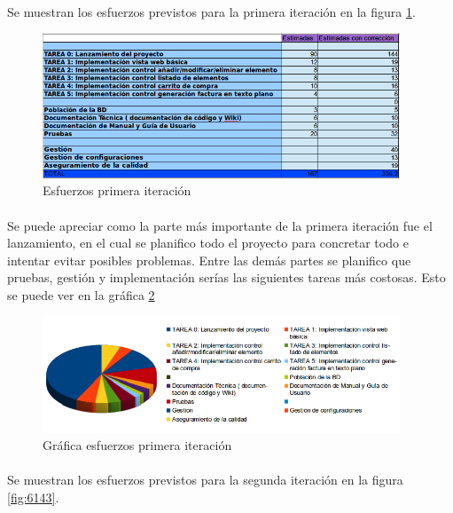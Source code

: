 

\paragraph{} Se muestran los esfuerzos previstos para la primera iteración en la figura \ref{fig:6141}.

\begin{figure}[h!]
\centering
\includegraphics[width=0.95\textwidth]{img/6141}
\caption{Esfuerzos primera iteración}
 \label{fig:6141}
\end{figure}

\paragraph{} Se puede apreciar como la parte más importante de la primera iteración fue el lanzamiento, en el cual se planifico todo el proyecto para concretar todo e intentar evitar posibles problemas. Entre las demás partes se planifico que pruebas, gestión y implementación serías las siguientes tareas más costosas. Esto se puede ver en la gráfica \ref{fig:6142}

\begin{figure}[h!]
\centering
\includegraphics[width=0.95\textwidth]{img/6142}
\caption{Gráfica esfuerzos primera iteración}
 \label{fig:6142}
\end{figure}

\paragraph{} Se muestran los esfuerzos previstos para la segunda iteración en la figura \ref{fig:6143}.

